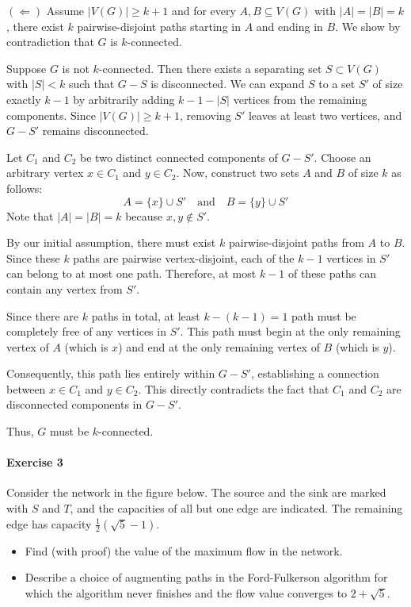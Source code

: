 \documentclass[a4paper,12pt]{article}
\begin{document}
\begin{enumerate}
    \medskip
    $(\Leftarrow)$ Assume $|V(G)| \ge k+1$ and for every $A, B \subseteq V(G)$ with $|A| = |B| = k$, there exist $k$ pairwise-disjoint paths starting in $A$ and ending in $B$. We show by contradiction that $G$ is $k$-connected.
    
    Suppose $G$ is not $k$-connected. Then there exists a separating set $S \subset V(G)$ with $|S| < k$ such that $G - S$ is disconnected. We can expand $S$ to a set $S'$ of size exactly $k-1$ by arbitrarily adding $k - 1 - |S|$ vertices from the remaining components. Since $|V(G)| \ge k+1$, removing $S'$ leaves at least two vertices, and $G - S'$ remains disconnected.
    
    Let $C_1$ and $C_2$ be two distinct connected components of $G - S'$. Choose an arbitrary vertex $x \in C_1$ and $y \in C_2$. Now, construct two sets $A$ and $B$ of size $k$ as follows:
    \[
    A = \{x\} \cup S' \quad \text{and} \quad B = \{y\} \cup S'
    \]
    Note that $|A| = |B| = k$ because $x, y \notin S'$. 
    
    By our initial assumption, there must exist $k$ pairwise-disjoint paths from $A$ to $B$. Since these $k$ paths are pairwise vertex-disjoint, each of the $k-1$ vertices in $S'$ can belong to at most one path. Therefore, at most $k-1$ of these paths can contain any vertex from $S'$.
    
    Since there are $k$ paths in total, at least $k - (k-1) = 1$ path must be completely free of any vertices in $S'$. This path must begin at the only remaining vertex of $A$ (which is $x$) and end at the only remaining vertex of $B$ (which is $y$). 
    
    Consequently, this path lies entirely within $G - S'$, establishing a connection between $x \in C_1$ and $y \in C_2$. This directly contradicts the fact that $C_1$ and $C_2$ are disconnected components in $G - S'$. 
    
    Thus, $G$ must be $k$-connected.
\end{enumerate}

\paragraph{Exercise 3}  Consider the network in the figure below. The source and the sink are marked with $S$ and $T$, and the capacities of all but one edge are indicated. The remaining edge has capacity $\frac12(\sqrt{5} - 1)$.


\begin{itemize}
	\item[(a)] Find (with proof) the value of the maximum flow in the network.
	\item[(b)] Describe a choice of augmenting paths in the Ford-Fulkerson algorithm for which the algorithm never finishes and the flow value converges to $2+\sqrt{5}$.
\end{itemize}
\end{document}
